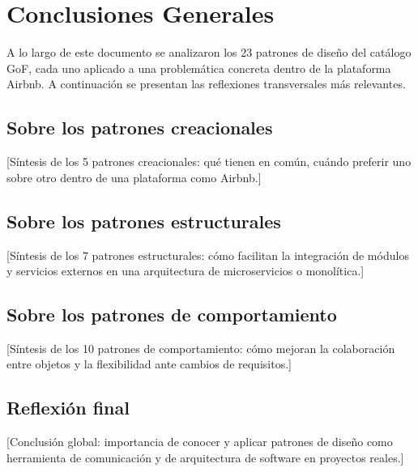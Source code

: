 
\chapter*{Conclusiones Generales}

A lo largo de este documento se analizaron los 23 patrones de diseño del catálogo GoF,
cada uno aplicado a una problemática concreta dentro de la plataforma Airbnb. A
continuación se presentan las reflexiones transversales más relevantes.

\section*{Sobre los patrones creacionales}

[Síntesis de los 5 patrones creacionales: qué tienen en común, cuándo preferir uno
sobre otro dentro de una plataforma como Airbnb.]

\section*{Sobre los patrones estructurales}

[Síntesis de los 7 patrones estructurales: cómo facilitan la integración de módulos
y servicios externos en una arquitectura de microservicios o monolítica.]

\section*{Sobre los patrones de comportamiento}

[Síntesis de los 10 patrones de comportamiento: cómo mejoran la colaboración entre
objetos y la flexibilidad ante cambios de requisitos.]

\section*{Reflexión final}

[Conclusión global: importancia de conocer y aplicar patrones de diseño como
herramienta de comunicación y de arquitectura de software en proyectos reales.]
